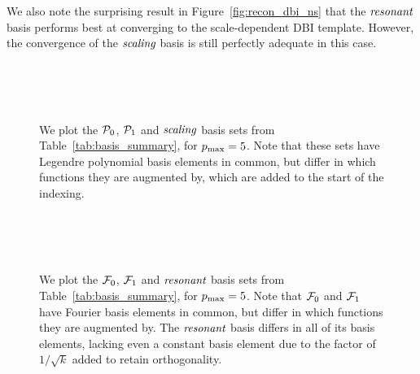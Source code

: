     We also note the surprising result in Figure~\ref{fig:recon_dbi_ns}
    that the $\textit{resonant}$ basis performs best at converging to the
    scale-dependent DBI template. However, the convergence of the
    $\textit{scaling}$ basis is still perfectly adequate in this case.
    \begin{figure}[!pth]
        \centering
        \\
        \\
        \\
        \caption{
            We plot the $\mathcal{P}_0$, $\mathcal{P}_1$ and $\textit{scaling}$ basis sets from
            Table~\ref{tab:basis_summary}, for $p_\text{max}=5$. Note that these sets
            have Legendre polynomial basis elements in common, but differ in
            which functions they are augmented by, which are added to the start of the
            indexing.
        }\label{fig:basis_pmax5_plots_a}
    \end{figure}
    \begin{figure}[!pth]
        \centering
        \\
        \\
        \\
        \caption{
            We plot the $\mathcal{F}_0$, $\mathcal{F}_1$ and $\textit{resonant}$ basis sets from
            Table~\ref{tab:basis_summary}, for $p_\text{max}=5$. Note that
            $\mathcal{F}_0$ and $\mathcal{F}_1$
            have Fourier basis elements in common, but differ in
            which functions they are augmented by. The $\textit{resonant}$ basis
            differs in all of its basis elements, lacking even
            a constant basis element due to the factor of
            $1/\sqrt{k}$ added to retain orthogonality.
        }\label{fig:basis_pmax5_plots_b}
    \end{figure}


